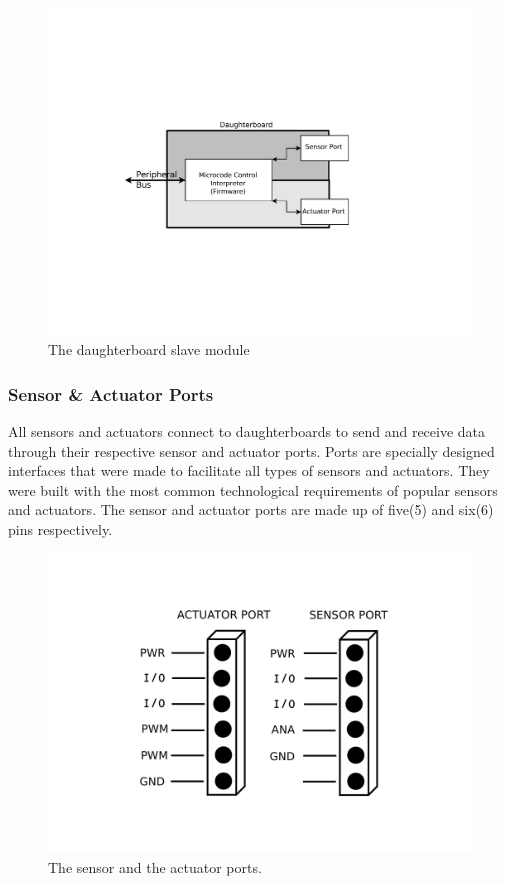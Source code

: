 	\begin{figure}[h]
	  \begin{center}
	    \includegraphics[width=1.0\columnwidth]{Figures/db.pdf}
	    \caption{The daughterboard slave module}
	  \end{center}
	\end{figure}
	
	\subsubsection{Sensor \& Actuator Ports} %
	\label{ssub:input_&_output_ports}
	All sensors and actuators connect to daughterboards to send and receive data through their respective sensor and actuator ports. Ports are specially designed interfaces that were made to facilitate all types of sensors and actuators. They were built with the most common technological requirements of popular sensors and actuators. The sensor and actuator ports are made up of five(5) and six(6) pins respectively.

\begin{figure}[h]
  \begin{center}
    \includegraphics[width=0.5\columnwidth]{Figures/Ports.pdf}
    \caption{The sensor and the actuator ports.}
  \end{center}
\end{figure}

